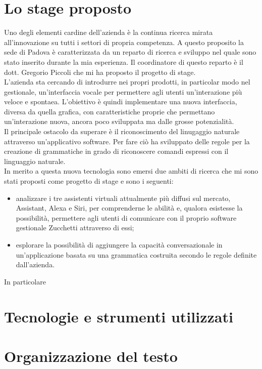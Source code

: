 \section{Lo stage proposto}
Uno degli elementi cardine dell'azienda è la continua ricerca mirata all'innovazione su tutti i settori di propria competenza. A questo proposito la sede di Padova è caratterizzata da un reparto di ricerca e sviluppo nel quale sono stato inserito durante la mia esperienza. Il coordinatore di questo reparto è il dott. Gregorio Piccoli che mi ha proposto il progetto di stage. \\
L'azienda sta cercando di introdurre nei propri prodotti, in particolar modo nel gestionale, un'interfaccia vocale per permettere agli utenti un'interazione più veloce e spontaea. L'obiettivo è quindi implementare una nuova interfaccia, diversa da quella grafica, con caratteristiche proprie che permettano un'interazione nuova, ancora poco sviluppata ma dalle grosse potenzialità. \\
Il principale ostacolo da superare è il riconoscimento del linugaggio naturale attraverso un'applicativo software. Per fare ciò ha sviluppato delle regole per la creazione di grammatiche in grado di riconoscere comandi espressi con il linguaggio naturale. \\
In merito a questa nuova tecnologia sono emersi due ambiti di ricerca che mi sono stati proposti come progetto di stage e sono i seguenti:
\begin{itemize}
	\item analizzare i tre assistenti virtuali attualmente più diffusi sul mercato, Assistant, Alexa e Siri, per comprenderne le abilità e, qualora esistesse la possibilità, permettere agli utenti di comunicare con il proprio software gestionale Zucchetti attraverso di essi;
	\item esplorare la possibilità di aggiungere la capacità conversazionale in un'applicazione basata su una grammatica costruita secondo le regole definite dall'azienda.
\end{itemize}

In particolare 

\section{Tecnologie e strumenti utilizzati}


\section{Organizzazione del testo}

